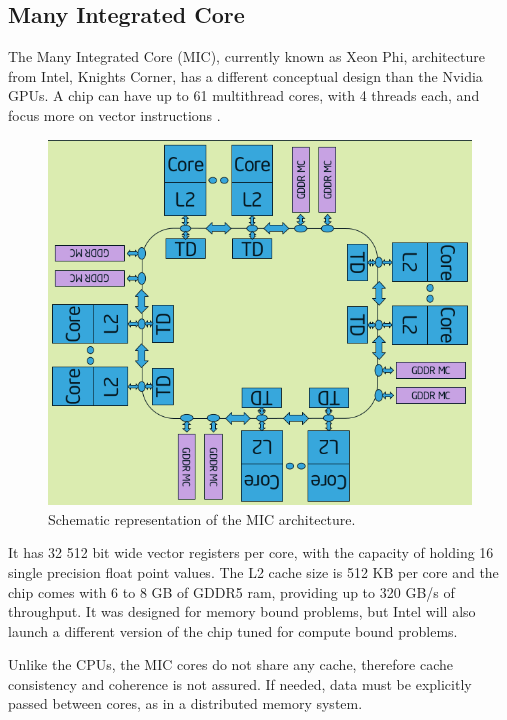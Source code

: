 \subsection{\intel Many Integrated Core}

The \intel Many Integrated Core (MIC), currently known as \intel Xeon Phi, architecture from Intel, Knights Corner, has a different conceptual design than the Nvidia GPUs. A chip can have up to 61 multithread cores, with 4 threads each, and focus more on vector instructions \cite{Intel:MIC:Elgar}. 

\begin{figure}[!htp]
	\begin{center}
		\includegraphics[scale=0.5]{../../common/img/mic_arch.png}
		\caption{Schematic representation of the \intel MIC architecture.}
		\label{fig:mic}
	\end{center}
\end{figure}

It has 32 512 bit wide vector registers per core, with the capacity of holding 16 single precision float point values. The L2 cache size is 512 KB per core and the chip comes with 6 to 8 GB of GDDR5 ram, providing up to 320 GB/s of throughput. It was designed for memory bound problems, but Intel will also launch a different version of the chip tuned for compute bound problems.

Unlike the CPUs, the MIC cores do not share any cache, therefore cache consistency and coherence is not assured. If needed, data must be explicitly passed between cores, as in a distributed memory system.

